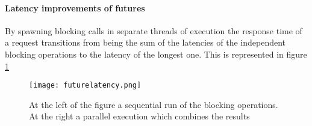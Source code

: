 \documentclass[../main.tex]{subfiles}
\begin{document}
\paragraph{Latency improvements of futures}

By spawning blocking calls in separate threads of execution the response time of
a request transitions from being the sum of the latencies of the independent
blocking operations to the latency of the longest one. This is represented in
figure \ref{fig:futurelatency}

\begin{figure}[ht]
  \centering
  \texttt{[image: futurelatency.png]}
  \caption{\label{fig:futurelatency}
    At the left of the figure a sequential run of the blocking operations. At
    the right a parallel execution which combines the results
  }
\end{figure}
\end{document}
